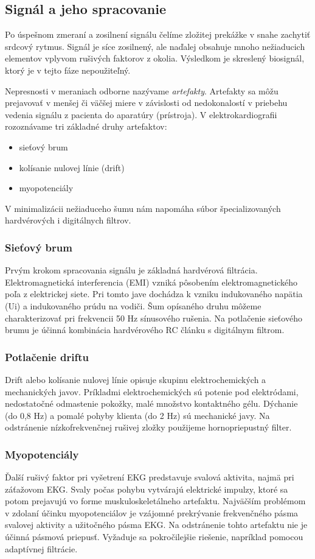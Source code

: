 \documentclass[titlepage]{article}
\begin{document}
\subsection{Signál a jeho spracovanie}
Po úspešnom zmeraní a zosilnení signálu čelíme zložitej prekážke v snahe zachytiť srdcový rytmus. Signál je síce zosilnený, ale naďalej obsahuje mnoho nežiaducich elementov vplyvom rušivých faktorov z okolia. Výsledkom je skreslený biosignál, ktorý je v tejto fáze nepoužiteľný.

Nepresnosti v meraniach odborne nazývame \emph{artefakty}. Artefakty sa môžu prejavovať v menšej či väčšej miere v závislosti od nedokonalostí v priebehu vedenia signálu z pacienta do aparatúry (prístroja). V elektrokardiografii rozoznávame tri základné druhy artefaktov:
\begin{itemize}
	\item sieťový brum
	\item kolísanie nulovej línie (drift)
	\item myopotenciály
\end{itemize}

V minimalizácii nežiaduceho šumu nám napomáha súbor špecializovaných hardvérových i digitálnych filtrov.

\subsubsection{Sieťový brum}
Prvým krokom spracovania signálu je základná hardvérová filtrácia. Elektromagnetická interferencia (EMI) vzniká pôsobením  elektromagnetického poľa z elektrickej siete. Pri tomto jave dochádza k vzniku indukovaného napätia (Ui) a indukovaného prúdu na vodiči. Šum opísaného druhu môžeme charakterizovať pri frekvencii 50 Hz sínusového rušenia. Na potlačenie sieťového brumu je účinná kombinácia hardvérového RC článku s digitálnym filtrom. 

\subsubsection{Potlačenie driftu}
Drift alebo kolísanie nulovej línie opisuje skupinu elektrochemických a mechanických javov. Príkladmi elektrochemických sú potenie pod elektródami, nedostatočné odmastenie pokožky, malé množstvo kontaktného gélu. Dýchanie (do 0,8 Hz) a pomalé pohyby klienta (do 2 Hz) sú mechanické javy. Na odstránenie nízkofrekvenčnej rušivej zložky použijeme hornopriepustný filter.

\subsubsection{Myopotenciály}
Ďalší rušivý faktor pri vyšetrení EKG predstavuje svalová aktivita, najmä pri záťažovom EKG. Svaly počas pohybu vytvárajú elektrické impulzy, ktoré sa potom prejavujú vo forme muskuloskeletálneho artefaktu. Najväčším problémom v zdolaní účinku myopotenciálov je vzájomné prekrývanie frekvenčného pásma svalovej aktivity a užitočného pásma EKG. Na odstránenie tohto artefaktu nie je účinná pásmová priepusť. Vyžaduje sa pokročilejšie riešenie, napríklad pomocou adaptívnej filtrácie. 
\end{document}

